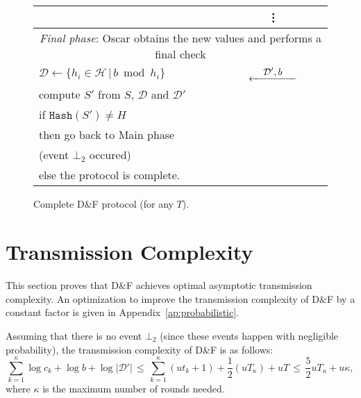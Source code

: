 \documentclass[twoside,envcountsame,runningheads]{llncs}
\newcommand{\Set}{\mathcal{H}}
\newcommand{\SetD}{\mathcal{D}}
\newcommand{\df}{D\&F\xspace}
\newcommand{\Hash}{\ensuremath{\mathtt{Hash}}}
\newcommand{\Lflow}[1]{\stackrel{\displaystyle #1}{\hbox to 5em{\leftarrowfill}}}
\newcommand{\apref}[1]{Appendix~\ref{#1}}
\newcommand{\apref}[1]{the full version~TODO}
\begin{document}
\begin{figure}[t]
\begin{tabular}{p{}cp{}}
 & \vdots & \\
\midrule
\multicolumn{3}{c}{\textit{Final phase}: Oscar obtains the new values and performs a final check } \\
\midrule
$\SetD \gets \{ h_i \in \Set \,|\, b \bmod h_i \}$ & $\Lflow{\SetD',b}$  & \\
compute $S'$ from $S$, $\SetD$ and $\SetD'$ & & \\
if $\Hash(S') \neq H$ & & \\
\hspace{0.2cm} then go back to Main phase && \\
\hspace{0.4cm} (event $\bot_2$ occured) & & \\
\hspace{0.2cm} else the protocol is complete. & & \\
\bottomrule
\end{tabular}\vspace{-0.25cm} %
\caption{Complete \df protocol (for any $T$).}
\label{fig:complete-df}
\end{figure}


\section{Transmission Complexity}
\label{sec:trans}

This section proves that \df achieves optimal asymptotic transmission complexity. An optimization to improve the transmission complexity of \df by a constant factor is given in \apref{ap:probabilistic}.


Assuming that there is no event $\bot_2$ (since these events happen with negligible probability), the transmission complexity of \df is as follows:
\[  \sum_{k=1}^\kappa \log c_k + \log b + \log |\SetD'|
 \,\leq\, \sum_{k=1}^\kappa (ut_k+1) + \frac{1}{2} (uT_\kappa) + u T
 \,\leq\, \frac{5}{2} u T_\kappa + u \kappa, \]
where $\kappa$ is the maximum number of rounds needed.
\end{document}
